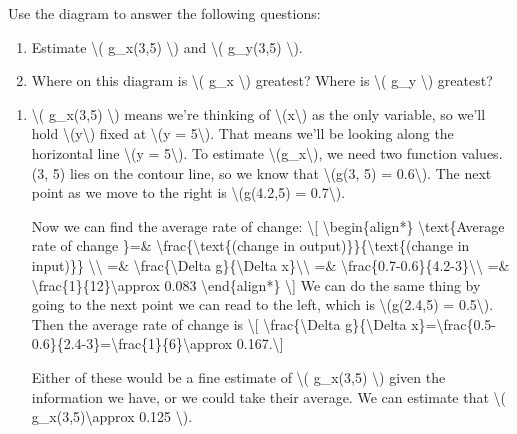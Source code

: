 Use the diagram to answer the following questions:

\begin{enumerate}
\tightlist
\item
  Estimate \textbackslash{}( g\_x(3,5) \textbackslash{}) and
  \textbackslash{}( g\_y(3,5) \textbackslash{}).
\item
  Where on this diagram is \textbackslash{}( g\_x \textbackslash{})
  greatest? Where is \textbackslash{}( g\_y \textbackslash{}) greatest?
\end{enumerate}

\begin{enumerate}
\item
  \textbackslash{}( g\_x(3,5) \textbackslash{}) means we're thinking of
  \textbackslash{}(x\textbackslash{}) as the only variable, so we'll
  hold \textbackslash{}(y\textbackslash{}) fixed at \textbackslash{}(y =
  5\textbackslash{}). That means we'll be looking along the horizontal
  line \textbackslash{}(y = 5\textbackslash{}). To estimate
  \textbackslash{}(g\_x\textbackslash{}), we need two function values.
  (3, 5) lies on the contour line, so we know that \textbackslash{}(g(3,
  5) = 0.6\textbackslash{}). The next point as we move to the right is
  \textbackslash{}(g(4.2,5) = 0.7\textbackslash{}).

  Now we can find the average rate of change: \textbackslash{}{[}
  \textbackslash{}begin\{align*\} \textbackslash{}text\{Average rate of
  change \}=\& \textbackslash{}frac\{\textbackslash{}text\{(change in
  output)\}\}\{\textbackslash{}text\{(change in input)\}\}
  \textbackslash{}\textbackslash{} =\&
  \textbackslash{}frac\{\textbackslash{}Delta g\}\{\textbackslash{}Delta
  x\}\textbackslash{}\textbackslash{} =\&
  \textbackslash{}frac\{0.7-0.6\}\{4.2-3\}\textbackslash{}\textbackslash{}
  =\& \textbackslash{}frac\{1\}\{12\}\textbackslash{}approx 0.083
  \textbackslash{}end\{align*\} \textbackslash{}{]} We can do the same
  thing by going to the next point we can read to the left, which is
  \textbackslash{}(g(2.4,5) = 0.5\textbackslash{}). Then the average
  rate of change is \textbackslash{}{[}
  \textbackslash{}frac\{\textbackslash{}Delta g\}\{\textbackslash{}Delta
  x\}=\textbackslash{}frac\{0.5-0.6\}\{2.4-3\}=\textbackslash{}frac\{1\}\{6\}\textbackslash{}approx
  0.167.\textbackslash{}{]}

  Either of these would be a fine estimate of \textbackslash{}(
  g\_x(3,5) \textbackslash{}) given the information we have, or we could
  take their average. We can estimate that \textbackslash{}(
  g\_x(3,5)\textbackslash{}approx 0.125 \textbackslash{}).


\end{enumerate}
